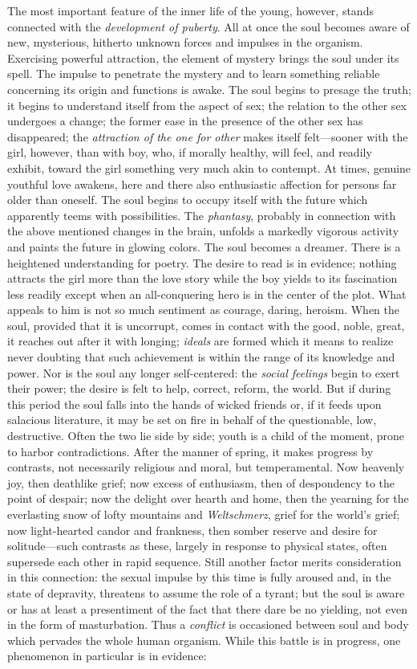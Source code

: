 The most important feature of the inner life of the young, however, stands connected with the \emph{development of puberty}. All at once the soul becomes aware of new, mysterious, hitherto unknown forces and impulses in the organism. Exercising powerful attraction, the element of mystery brings the soul under its spell. The impulse to penetrate the mystery and to learn something reliable concerning its origin and functions is awake. The soul begins to presage the truth; it begins to understand itself from the aspect of sex; the relation to the other sex undergoes a change; the former ease in the presence of the other sex has disappeared; the \emph{attraction of the one for other} makes itself felt—sooner with the girl, however, than with boy, who, if morally healthy, will feel, and readily exhibit, toward the girl something very much akin to contempt. At times, genuine youthful love awakens, here and there also enthusiastic affection for persons far older than oneself. The soul begins to occupy itself with the future which apparently teems with possibilities. The \emph{phantasy}, probably in connection with the above mentioned changes in the brain, unfolds a markedly vigorous activity and paints the future in glowing colors. The soul becomes a dreamer. There is a heightened understanding
for poetry. The desire to read is in evidence; nothing attracts the girl more than the love story while the boy yields to its fascination less readily except when an all-conquering hero is in the center of the plot. What appeals to him is not so much sentiment as courage, daring, heroism. When the soul, provided that it is uncorrupt, comes in contact with the good, noble, great, it reaches out after it with longing; \emph{ideals} are formed which it means to realize never doubting that such achievement is within the range of its knowledge and power. Nor is the soul any longer self-centered: the \emph{social feelings} begin to exert their power; the desire is felt to help, correct, reform, the world. But if during this period the soul falls into the hands of wicked friends or, if it feeds upon salacious literature, it may be set on fire in behalf of the questionable, low, destructive. Often the two lie side by side; youth is a child of the moment, prone to harbor contradictions. After the manner of spring, it makes progress by contrasts, not necessarily religious and moral, but temperamental. Now heavenly joy, then deathlike grief; now excess of enthusiasm, then of despondency to the point of despair; now the delight over hearth and home, then the yearning for the everlasting snow of lofty mountains and \emph{Weltschmerz}, grief for the world's grief; now light-hearted candor and frankness, then somber reserve and desire for solitude—such contrasts as these, largely in response to physical states, often supersede each other in rapid sequence. Still another factor merits consideration in this connection: the sexual impulse by this time is fully aroused and, in the state of depravity, threatens to assume the role of a tyrant; but the soul is aware or has at least a presentiment of the fact that there dare be no yielding, not even in the form of masturbation. Thus a \emph{conflict} is occasioned between soul and body which pervades the whole human organism. While this battle is in progress, one phenomenon in particular is in evidence:
